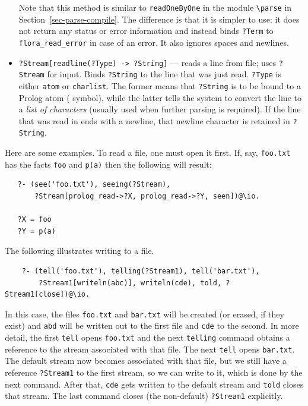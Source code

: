 \documentclass[11pt]{article}
\newcommand{\ERGO}{\mbox{\smaller{\ensuremath{\cal{E}}\smaller{{\sc{RGO}}}}}\xspace}
\newcommand{\FLSYSTEM}{\ERGO}
\newcommand{\bs}{\textbackslash}
\begin{document}
\begin{itemize}
  Note that this method is similar to \texttt{readOneByOne} in the module
  \texttt{\bs{}parse} in Section~\ref{sec-parse-compile}. The difference is
  that it is simpler to use: it does not return any status or error information
  and instead binds \texttt{?Term} to \texttt{flora\_read\_error} in case
  of an error. It also ignores spaces and newlines. 
\item {\tt ?Stream[readline(?Type) -> ?String]} --- reads a line from file;
  uses {\tt ?Stream} for input. Binds \texttt{?String} to the line that was
  just read.  {\tt ?Type} is either
  {\tt atom} or
  {\tt charlist}. The former means that {\tt ?String} is to be bound to a
  Prolog atom (\FLSYSTEM symbol), while
  the latter tells the system to convert the line to a \emph{list of
    characters} (usually used when further parsing is required).  
  If the line that was read in ends with a newline, that newline character is
  retained in \texttt{?String}. 
\end{itemize}

\noindent
Here are some examples.
To read a file, one must open it first. If, say,
\texttt{foo.txt} has the facts \texttt{foo} and \texttt{p(a)} then the
following will result:
\begin{verbatim}
   ?- (see('foo.txt'), seeing(?Stream),
       ?Stream[prolog_read->?X, prolog_read->?Y, seen])@\io.

   ?X = foo
   ?Y = p(a)
\end{verbatim}
The following illustrates writing to a file.
\begin{verbatim}
    ?- (tell('foo.txt'), telling(?Stream1), tell('bar.txt'),
        ?Stream1[writeln(abc)], writeln(cde), told, ?Stream1[close])@\io.
\end{verbatim}
In this case, the files \texttt{foo.txt} and \texttt{bar.txt} will be
created (or erased, if they exist)  and \texttt{abd} will be written out to
the first file and \texttt{cde} to the second.  
In more detail, the first \texttt{tell} opens \texttt{foo.txt} and the next
\texttt{telling} command obtains a reference to the stream associated with
that file. The next \texttt{tell} opens \texttt{bar.txt}. The default
stream now becomes associated with that file, but we still have a reference
\texttt{?Stream1} to the first stream, so we can write to it, which is done
by the next command. After that, \texttt{cde} gets written to the default
stream and \texttt{told} closes that stream. The last command closes (the
non-default) \texttt{?Stream1} explicitly. 
\end{document}
